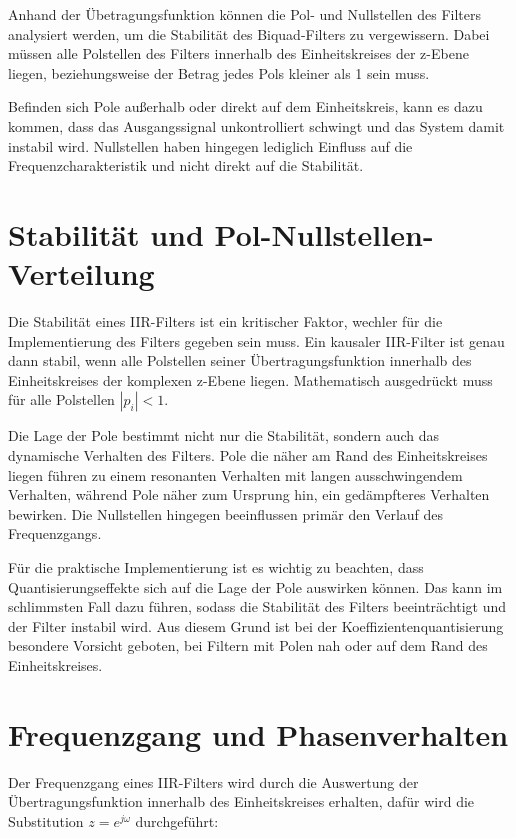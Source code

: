 \documentclass[
  ngerman,
  letterpaper,
  DIV=11]{scrreprt}
\begin{document}
Anhand der Übetragungsfunktion können die Pol- und Nullstellen des
Filters analysiert werden, um die Stabilität des Biquad-Filters zu
vergewissern. Dabei müssen alle Polstellen des Filters innerhalb des
Einheitskreises der z-Ebene liegen, beziehungsweise der Betrag jedes
Pols kleiner als 1 sein muss.

Befinden sich Pole außerhalb oder direkt auf dem Einheitskreis, kann es
dazu kommen, dass das Ausgangssignal unkontrolliert schwingt und das
System damit instabil wird. Nullstellen haben hingegen lediglich
Einfluss auf die Frequenzcharakteristik und nicht direkt auf die
Stabilität.

\section{Stabilität und
Pol-Nullstellen-Verteilung}\label{stabilituxe4t-und-pol-nullstellen-verteilung}

Die Stabilität eines IIR-Filters ist ein kritischer Faktor, wechler für
die Implementierung des Filters gegeben sein muss. Ein kausaler
IIR-Filter ist genau dann stabil, wenn alle Polstellen seiner
Übertragungsfunktion innerhalb des Einheitskreises der komplexen z-Ebene
liegen. Mathematisch ausgedrückt muss für alle Polstellen \(|p_i| < 1\).

Die Lage der Pole bestimmt nicht nur die Stabilität, sondern auch das
dynamische Verhalten des Filters. Pole die näher am Rand des
Einheitskreises liegen führen zu einem resonanten Verhalten mit langen
ausschwingendem Verhalten, während Pole näher zum Ursprung hin, ein
gedämpfteres Verhalten bewirken. Die Nullstellen hingegen beeinflussen
primär den Verlauf des Frequenzgangs.

Für die praktische Implementierung ist es wichtig zu beachten, dass
Quantisierungseffekte sich auf die Lage der Pole auswirken können. Das
kann im schlimmsten Fall dazu führen, sodass die Stabilität des Filters
beeinträchtigt und der Filter instabil wird. Aus diesem Grund ist bei
der Koeffizientenquantisierung besondere Vorsicht geboten, bei Filtern
mit Polen nah oder auf dem Rand des Einheitskreises.

\section{Frequenzgang und
Phasenverhalten}\label{frequenzgang-und-phasenverhalten}

Der Frequenzgang eines IIR-Filters wird durch die Auswertung der
Übertragungsfunktion innerhalb des Einheitskreises erhalten, dafür wird
die Substitution \(z = e^{j\omega}\) durchgeführt:
\end{document}
